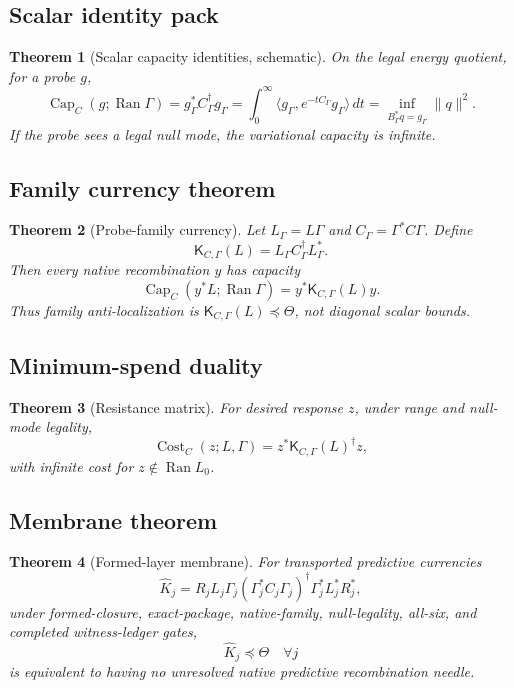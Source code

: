 \documentclass[11pt]{article}
\newtheorem{theorem}{Theorem}
\newcommand{\K}{\mathsf K}
\newcommand{\Ran}{\operatorname{Ran}}
\newcommand{\ProbeCap}{\operatorname{Cap}}
\begin{document}
\subsection{Scalar identity pack}
\begin{theorem}[Scalar capacity identities, schematic]
On the legal energy quotient, for a probe $g$,
\[
\ProbeCap_C(g;\Ran\Gamma)
=g_\Gamma^*C_\Gamma^\dagger g_\Gamma
=\int_0^\infty \langle g_\Gamma,e^{-tC_\Gamma}g_\Gamma\rangle\,dt
=\inf_{B_\Gamma^*q=g_\Gamma}\|q\|^2.
\]
If the probe sees a legal null mode, the variational capacity is infinite.
\end{theorem}

\subsection{Family currency theorem}
\begin{theorem}[Probe-family currency]
Let $L_\Gamma=L\Gamma$ and $C_\Gamma=\Gamma^*C\Gamma$.  Define
\[
\K_{C,\Gamma}(L)=L_\Gamma C_\Gamma^\dagger L_\Gamma^*.
\]
Then every native recombination $y$ has capacity
\[
\ProbeCap_C(y^*L;\Ran\Gamma)=y^*\K_{C,\Gamma}(L)y.
\]
Thus family anti-localization is $\K_{C,\Gamma}(L)\preceq\Theta$, not diagonal scalar bounds.
\end{theorem}

\subsection{Minimum-spend duality}
\begin{theorem}[Resistance matrix]
For desired response $z$, under range and null-mode legality,
\[
\operatorname{Cost}_C(z;L,\Gamma)=z^*\K_{C,\Gamma}(L)^\dagger z,
\]
with infinite cost for $z\notin\Ran L_0$.
\end{theorem}

\subsection{Membrane theorem}
\begin{theorem}[Formed-layer membrane]
For transported predictive currencies
\[
\widehat K_j=R_jL_j\Gamma_j(\Gamma_j^*C_j\Gamma_j)^\dagger\Gamma_j^*L_j^*R_j^*,
\]
under formed-closure, exact-package, native-family, null-legality, all-six, and completed witness-ledger gates,
\[
\widehat K_j\preceq\Theta\quad\forall j
\]
is equivalent to having no unresolved native predictive recombination needle.
\end{theorem}
\end{document}
